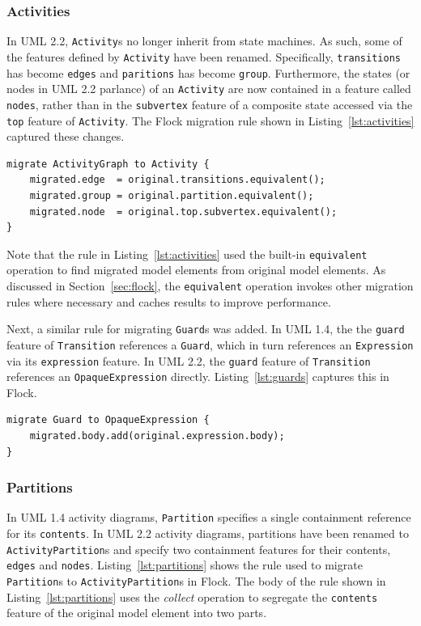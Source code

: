 \subsubsection{Activities}
In UML 2.2, \texttt{Activity}s no longer inherit from state machines. As such, some of the features defined by \texttt{Activity} have been renamed. Specifically, \texttt{tr\-an\-si\-ti\-o\-ns} has become \texttt{edges} and \texttt{paritions} has become \texttt{group}. Furthermore, the states (or nodes in UML 2.2 parlance) of an \texttt{Activity} are now contained in a feature called \texttt{nodes}, rather than in the \texttt{subvertex} feature of a composite state accessed via the \texttt{top} feature of \texttt{Activity}. The Flock migration rule shown in Listing~\ref{lst:activities} captured these changes.

\begin{lstlisting}[caption=Migrating ActivityGraphs, label=lst:activities, language=Flock]
migrate ActivityGraph to Activity {
	migrated.edge  = original.transitions.equivalent();
	migrated.group = original.partition.equivalent();
	migrated.node  = original.top.subvertex.equivalent();
}
\end{lstlisting}

Note that the rule in Listing~\ref{lst:activities} used the built-in \texttt{equivalent} operation to find migrated model elements from original model elements. As discussed in Section~\ref{sec:flock}, the \texttt{equivalent} operation invokes other migration rules where necessary and caches results to improve performance.

Next, a similar rule for migrating \texttt{Guard}s was added. In UML 1.4, the the \texttt{guard} feature of \texttt{Transition} references a \texttt{Guard}, which in turn references an \texttt{Ex\-pr\-es\-si\-on} via its \texttt{expression} feature. In UML 2.2, the \texttt{guard} feature of \texttt{Transition} references an \texttt{OpaqueExpression} directly. Listing~\ref{lst:guards} captures this in Flock.

\begin{lstlisting}[caption=Migrating Guards, label=lst:guards, language=Flock]
migrate Guard to OpaqueExpression {
	migrated.body.add(original.expression.body);
}

\end{lstlisting}


\subsubsection{Partitions}
In UML 1.4 activity diagrams, \texttt{Partition} specifies a single containment reference for its \texttt{contents}. In UML 2.2 activity diagrams, partitions have been renamed to \texttt{ActivityPartition}s and specify two containment features for their contents, \texttt{edges} and \texttt{nodes}. Listing~\ref{lst:partitions} shows the rule used to migrate \texttt{Partition}s to \texttt{ActivityPartition}s in Flock. The body of the rule shown in Listing~\ref{lst:partitions} uses the \emph{collect} operation to segregate the \texttt{contents} feature of the original model element into two parts.

